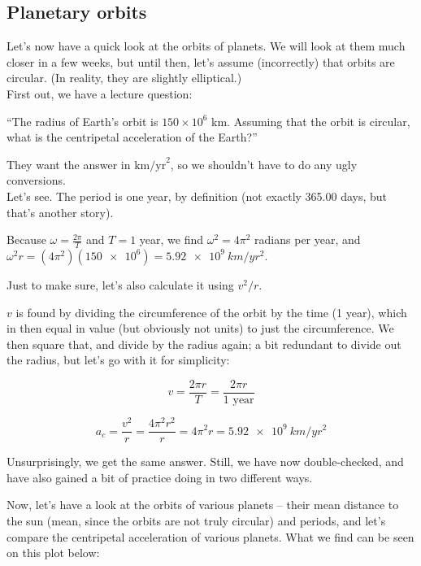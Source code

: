 \subsection{Planetary orbits}

Let's now have a quick look at the orbits of planets. We will look at them much closer in a few weeks, but until then, let's assume (incorrectly) that orbits are circular. (In reality, they are slightly elliptical.)\\
First out, we have a lecture question:

``The radius of Earth's orbit is $150 \times 10^6$ km. Assuming that the orbit is circular, what is the centripetal acceleration of the Earth?''

They want the answer in $\text{km/yr}^2$, so we shouldn't have to do any ugly conversions.\\
Let's see. The period is one year, by definition (not exactly 365.00 days, but that's another story).

Because $\omega = \frac{2\pi}{T}$ and $T = 1$ year, we find $\omega^2 = 4\pi^2$ radians per year, and $\omega^2 r = (4 \pi^2)(\num{150e6}) = \SI{5.92e9}{km/yr^2}$.

Just to make sure, let's also calculate it using $v^2/r$.

$v$ is found by dividing the circumference of the orbit by the time (1 year), which in then equal in value (but obviously not units) to just the circumference. We then square that, and divide by the radius again; a bit redundant to divide out the radius, but let's go with it for simplicity:

\begin{equation}
v = \frac{2 \pi r}{T} = \frac{2 \pi r}{1 \text{ year}}
\end{equation}

\begin{equation}
a_c = \frac{v^2}{r} = \frac{4 \pi^2 r^2}{r} = 4 \pi^2 r = \SI{5.92e9}{km/yr^2}
\end{equation}

Unsurprisingly, we get the same answer. Still, we have now double-checked, and have also gained a bit of practice doing in two different ways.

Now, let's have a look at the orbits of various planets -- their mean distance to the sun (mean, since the orbits are not truly circular) and periods, and let's compare the centripetal acceleration of various planets. What we find can be seen on this plot below:

